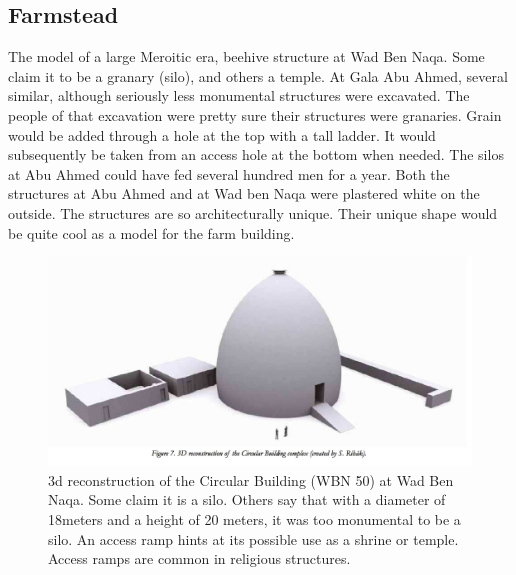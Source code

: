 \documentclass[a4paper,12pt]{scrreprt}
\begin{document}
\subsection{Farmstead}

The model of a large Meroitic era, beehive structure at Wad Ben Naqa. Some claim it to be a granary (silo), and others a temple. At Gala Abu Ahmed, several similar, although seriously less monumental structures were excavated. The people of that excavation were pretty sure their structures were granaries. Grain would be added through a hole at the top with a tall ladder. It would subsequently be taken from an access hole at the bottom when needed. The silos at Abu Ahmed could have fed several hundred men for a year. Both the structures at Abu Ahmed and at Wad ben Naqa were plastered white on the outside. The structures are so architecturally unique. Their unique shape would be quite cool as a model for the farm building.

\begin{figure}[H]
	\centering
	\includegraphics[width=\textwidth]{img/farmstead/3d_reconstruction}
	\caption{3d reconstruction of the Circular Building (WBN 50) at Wad Ben Naqa. Some claim it is a silo. Others say that with a diameter of 18meters and a height of 20 meters, it was too monumental to be a silo. An access ramp hints at its possible use as a shrine or temple. Access ramps are common in religious structures. }
\end{figure}
\end{document}
